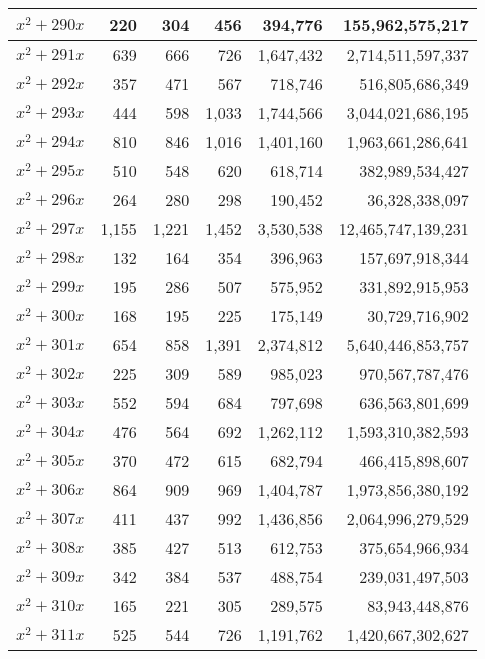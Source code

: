 \documentclass[a4paper]{amsproc}
\theoremstyle{plain}
\theoremstyle{named}
\begin{document}
\begin{longtable}{ | l | r | r | r | r | r | }
$x^2 + 290x$ & 220 & 304 & 456 & 394{,}776 & 155{,}962{,}575{,}217 \\ \hline
$x^2 + 291x$ & 639 & 666 & 726 & 1{,}647{,}432 & 2{,}714{,}511{,}597{,}337 \\ \hline
$x^2 + 292x$ & 357 & 471 & 567 & 718{,}746 & 516{,}805{,}686{,}349 \\ \hline
$x^2 + 293x$ & 444 & 598 & 1{,}033 & 1{,}744{,}566 & 3{,}044{,}021{,}686{,}195 \\ \hline
$x^2 + 294x$ & 810 & 846 & 1{,}016 & 1{,}401{,}160 & 1{,}963{,}661{,}286{,}641 \\ \hline
$x^2 + 295x$ & 510 & 548 & 620 & 618{,}714 & 382{,}989{,}534{,}427 \\ \hline
$x^2 + 296x$ & 264 & 280 & 298 & 190{,}452 & 36{,}328{,}338{,}097 \\ \hline
$x^2 + 297x$ & 1{,}155 & 1{,}221 & 1{,}452 & 3{,}530{,}538 & 12{,}465{,}747{,}139{,}231 \\ \hline
$x^2 + 298x$ & 132 & 164 & 354 & 396{,}963 & 157{,}697{,}918{,}344 \\ \hline
$x^2 + 299x$ & 195 & 286 & 507 & 575{,}952 & 331{,}892{,}915{,}953 \\ \hline
$x^2 + 300x$ & 168 & 195 & 225 & 175{,}149 & 30{,}729{,}716{,}902 \\ \hline
$x^2 + 301x$ & 654 & 858 & 1{,}391 & 2{,}374{,}812 & 5{,}640{,}446{,}853{,}757 \\ \hline
$x^2 + 302x$ & 225 & 309 & 589 & 985{,}023 & 970{,}567{,}787{,}476 \\ \hline
$x^2 + 303x$ & 552 & 594 & 684 & 797{,}698 & 636{,}563{,}801{,}699 \\ \hline
$x^2 + 304x$ & 476 & 564 & 692 & 1{,}262{,}112 & 1{,}593{,}310{,}382{,}593 \\ \hline
$x^2 + 305x$ & 370 & 472 & 615 & 682{,}794 & 466{,}415{,}898{,}607 \\ \hline
$x^2 + 306x$ & 864 & 909 & 969 & 1{,}404{,}787 & 1{,}973{,}856{,}380{,}192 \\ \hline
$x^2 + 307x$ & 411 & 437 & 992 & 1{,}436{,}856 & 2{,}064{,}996{,}279{,}529 \\ \hline
$x^2 + 308x$ & 385 & 427 & 513 & 612{,}753 & 375{,}654{,}966{,}934 \\ \hline
$x^2 + 309x$ & 342 & 384 & 537 & 488{,}754 & 239{,}031{,}497{,}503 \\ \hline
$x^2 + 310x$ & 165 & 221 & 305 & 289{,}575 & 83{,}943{,}448{,}876 \\ \hline
$x^2 + 311x$ & 525 & 544 & 726 & 1{,}191{,}762 & 1{,}420{,}667{,}302{,}627 \\ \hline

\end{longtable}
\end{document}
